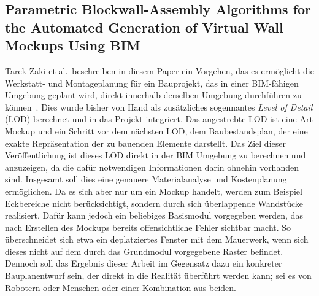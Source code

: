 \subsection{Parametric Blockwall-Assembly Algorithms for the Automated Generation of Virtual Wall Mockups Using BIM}
Tarek Zaki et al.\ beschreiben in diesem Paper ein Vorgehen, das es ermöglicht die Werkstatt- und Montageplanung für ein Bauprojekt, das in einer BIM-fähigen Umgebung geplant wird, direkt innerhalb derselben Umgebung durchführen zu können~\cite{Zaki2017}.
Dies wurde bisher von Hand als zusätzliches sogennantes \textit{Level of Detail} (LOD) berechnet und in das Projekt integriert.
Das angestrebte LOD ist eine Art Mockup und ein Schritt vor dem nächsten LOD, dem Baubestandsplan, der eine exakte Repräsentation der zu bauenden Elemente darstellt.
Das Ziel dieser Veröffentlichung ist dieses LOD direkt in der BIM Umgebung zu berechnen und anzuzeigen, da die dafür notwendigen Informationen darin ohnehin vorhanden sind.
Insgesamt soll dies eine genauere Materialanalyse und Kostenplanung ermöglichen.
Da es sich aber \glqq{}nur\grqq{} um ein Mockup handelt, werden zum Beispiel Eckbereiche nicht berücksichtigt, sondern durch sich überlappende Wandstücke realisiert.
Dafür kann jedoch ein beliebiges Basismodul vorgegeben werden, das nach Erstellen des Mockups bereits offensichtliche Fehler sichtbar macht.
So überschneidet sich etwa ein deplatziertes Fenster mit dem Mauerwerk, wenn sich dieses nicht auf dem durch das Grundmodul vorgegebene Raster befindet.
Dennoch soll das Ergebnis dieser Arbeit im Gegensatz dazu ein konkreter Bauplanentwurf sein, der direkt in die Realität überführt werden kann; sei es von Robotern oder Menschen oder einer Kombination aus beiden.